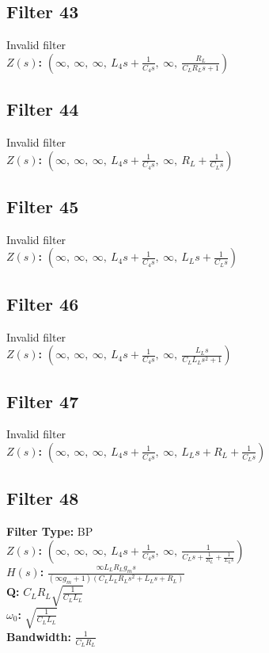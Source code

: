 \documentclass{article}
\begin{document}
\subsection*{Filter 43}
Invalid filter \\ 
\textbf{$Z(s)$:} $\left( \infty, \  \infty, \  \infty, \  L_{4} s + \frac{1}{C_{4} s}, \  \infty, \  \frac{R_{L}}{C_{L} R_{L} s + 1}\right)$ \\ 
\subsection*{Filter 44}
Invalid filter \\ 
\textbf{$Z(s)$:} $\left( \infty, \  \infty, \  \infty, \  L_{4} s + \frac{1}{C_{4} s}, \  \infty, \  R_{L} + \frac{1}{C_{L} s}\right)$ \\ 
\subsection*{Filter 45}
Invalid filter \\ 
\textbf{$Z(s)$:} $\left( \infty, \  \infty, \  \infty, \  L_{4} s + \frac{1}{C_{4} s}, \  \infty, \  L_{L} s + \frac{1}{C_{L} s}\right)$ \\ 
\subsection*{Filter 46}
Invalid filter \\ 
\textbf{$Z(s)$:} $\left( \infty, \  \infty, \  \infty, \  L_{4} s + \frac{1}{C_{4} s}, \  \infty, \  \frac{L_{L} s}{C_{L} L_{L} s^{2} + 1}\right)$ \\ 
\subsection*{Filter 47}
Invalid filter \\ 
\textbf{$Z(s)$:} $\left( \infty, \  \infty, \  \infty, \  L_{4} s + \frac{1}{C_{4} s}, \  \infty, \  L_{L} s + R_{L} + \frac{1}{C_{L} s}\right)$ \\ 
\subsection*{Filter 48}
\textbf{Filter Type:} BP \\ 
\textbf{$Z(s)$:} $\left( \infty, \  \infty, \  \infty, \  L_{4} s + \frac{1}{C_{4} s}, \  \infty, \  \frac{1}{C_{L} s + \frac{1}{R_{L}} + \frac{1}{L_{L} s}}\right)$ \\ 
\textbf{$H(s)$:} $\frac{\infty L_{L} R_{L} g_{m} s}{\left(\infty g_{m} + 1\right) \left(C_{L} L_{L} R_{L} s^{2} + L_{L} s + R_{L}\right)}$ \\ 
\textbf{Q:} $C_{L} R_{L} \sqrt{\frac{1}{C_{L} L_{L}}}$ \\ 
\textbf{$\omega_0$:} $\sqrt{\frac{1}{C_{L} L_{L}}}$ \\ 
\textbf{Bandwidth:} $\frac{1}{C_{L} R_{L}}$ \\ 
\end{document}
